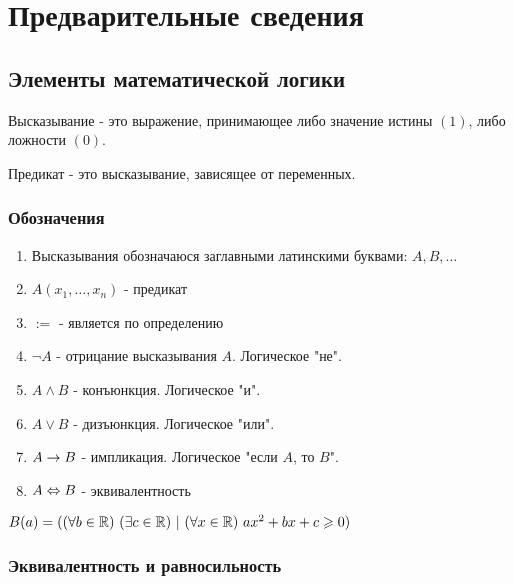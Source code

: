 \section{Предварительные сведения}

\subsection{Элементы математической логики}

\begin{definition}
    Высказывание - это выражение, принимающее либо значение истины $(1)$, либо ложности $(0)$.
\end{definition}

\begin{definition}
    Предикат - это высказывание, зависящее от переменных.
\end{definition}

\subsubsection*{Обозначения}

\begin{enumerate}
    \item Высказывания обозначаюся заглавными латинскими буквами: $A, B, \dots$
    \item $A(x_1, \dots, x_n)$ - предикат
    \item $:=$ - является по определению
    \item $\neg A$ - отрицание высказывания $A$. Логическое "не".
    \item $A \wedge B$ - конъюнкция. Логическое "и".
    \item $A \vee B$ - дизъюнкция. Логическое "или".
    \item $A \rightarrow B$ - импликация. Логическое "если $A$, то $B$".
    \item $A \Leftrightarrow B$ - эквивалентность
\end{enumerate}

\begin{example}[предиката]
    $B(a) = ((\forall b \in \mathbb{R})\ (\exists c \in \mathbb{R})\ |\ (\forall x \in \mathbb{R})\ ax^2 + bx + c \geqslant 0)$
\end{example}


\subsubsection*{Эквивалентность и равносильность}

